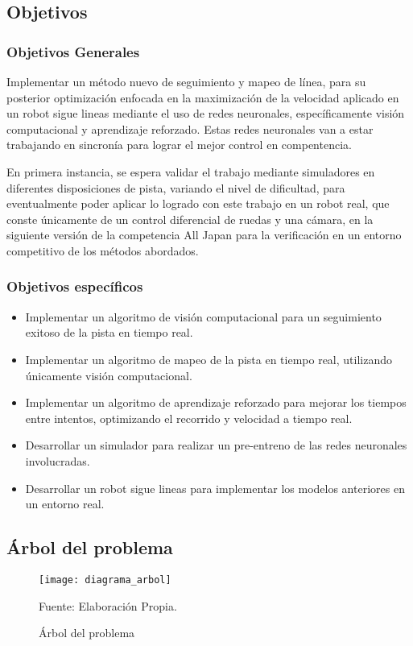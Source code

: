 \subsection{Objetivos}

\subsubsection{Objetivos Generales}

Implementar un método nuevo de seguimiento y mapeo de línea, para su posterior optimización enfocada en la maximización de la velocidad aplicado en un robot sigue lineas  mediante el uso de redes neuronales, específicamente visión computacional y aprendizaje reforzado. Estas redes neuronales van a estar trabajando en sincronía para lograr el mejor control en compentencia.

En primera instancia, se espera validar el trabajo mediante simuladores en diferentes disposiciones de pista, variando el nivel de dificultad, para eventualmente poder aplicar lo logrado con este trabajo en un robot real, que conste únicamente de un control diferencial de ruedas y una cámara, en la siguiente versión de la competencia All Japan para la verificación en un entorno competitivo de los métodos abordados.

\subsubsection{Objetivos específicos}

\begin{itemize}
	\item Implementar un algoritmo de visión computacional para un seguimiento exitoso de la pista en tiempo real.
	\item Implementar un algoritmo de mapeo de la pista en tiempo real, utilizando únicamente visión computacional.
	\item Implementar un algoritmo de aprendizaje reforzado para mejorar los tiempos entre intentos, optimizando el recorrido y velocidad a tiempo real.
	\item Desarrollar un simulador para realizar un pre-entreno de las redes neuronales involucradas.
	\item Desarrollar un robot sigue lineas para implementar los modelos anteriores en un entorno real.
\end{itemize}
\newpage
\subsection{Árbol del problema}

\begin{figure}[h]
\centering
\texttt{[image: diagrama\_arbol]}
\caption{\label{fig:arbol} Árbol del problema} Fuente: Elaboración Propia.
\end{figure}
